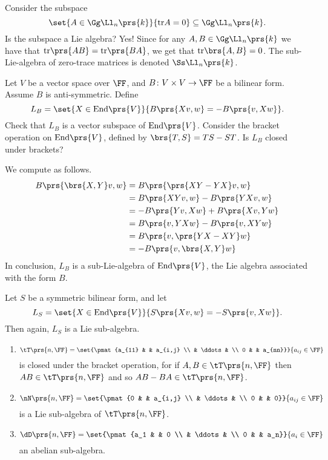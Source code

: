 \documentclass[10pt,a4paper,twoside,openany,hidelinks]{book}
\begin{document}
\begin{exercise}
Consider the subspace \[\set{A \in \Gg \Ll_n\prs{k}}{\mathrm{tr} A = 0} \subseteq \Gg \Ll_n\prs{k}\text{.}\] Is the subspace a Lie algebra? Yes! Since for any $A,B \in \Gg \Ll_n\prs{k}$ we have that $\mathrm{tr}\prs{AB} = \mathrm{tr}\prs{BA}$, we get that $\mathrm{tr}\brs{A,B} = 0$.
The sub-Lie-algebra of zero-trace matrices is denoted $\Ss\Ll_n\prs{k}$.
\end{exercise}
\begin{exercise}
Let $V$ be a vector space over $\FF$, and $B \colon V \times V \to \FF$ be a bilinear form.
Assume $B$ is anti-symmetric. Define \[L_B = \set{X \in \mathrm{End}\prs{V}}{B\prs{Xv,w} = -B\prs{v,Xw}}\text{.}\]
Check that $L_B$ is a vector subspace of $\mathrm{End}\prs{V}$.
Consider the bracket operation on $\mathrm{End}\prs{V}$, defined by $\brs{T,S} = TS - ST$.
Is $L_B$ closed under brackets?
\end{exercise}
\begin{solution}
We compute as follows.
\begin{align*}
B\prs{\brs{X,Y}v, w} &= B\prs{\prs{XY - YX}v, w} \\
&= B\prs{XY v, w} - B\prs{YXv,w} \\
&= -B\prs{Yv,Xw} + B\prs{Xv,Yw} \\
&= B\prs{v,YXw} -B\prs{v,XYw} \\
&= B\prs{v, \prs{YX - XY}w} \\
&= -B\prs{v, \brs{X,Y}w}
\end{align*}
In conclusion, $L_B$ is a sub-Lie-algebra of $\mathrm{End}\prs{V}$, the Lie algebra associated with the form $B$.
\end{solution}
\begin{exercise}
Let $S$ be a symmetric bilinear form, and let \[L_S = \set{X \in \mathrm{End}\prs{V}}{S\prs{Xv, w} = -S\prs{v,Xw}}\text{.}\]
Then again, $L_S$ is a Lie sub-algebra.
\end{exercise}
\begin{examples}
\begin{enumerate}
\item
\[\tT\prs{n,\FF} = \set{\pmat{a_{11} & & a_{i,j} \\ & \ddots & \\ 0 & & a_{nn}}}{a_{ij} \in \FF}\]
is closed under the bracket operation, for if $A,B \in \tT\prs{n,\FF}$ then $AB \in \tT\prs{n,\FF}$ and so $AB - BA \in \tT\prs{n,\FF}$.
\item \[\nN\prs{n,\FF} = \set{\pmat{0 & & a_{i,j} \\ & \ddots & \\ 0 & & 0}}{a_{ij} \in \FF}\]
is a Lie sub-algebra of $\tT\prs{n,\FF}$.
\item \[\dD\prs{n,\FF} = \set{\pmat{a_1 & & 0 \\ & \ddots & \\ 0 & & a_n}}{a_i \in \FF}\]
an abelian sub-algebra. 
\end{enumerate}
\end{examples}
\end{document}
